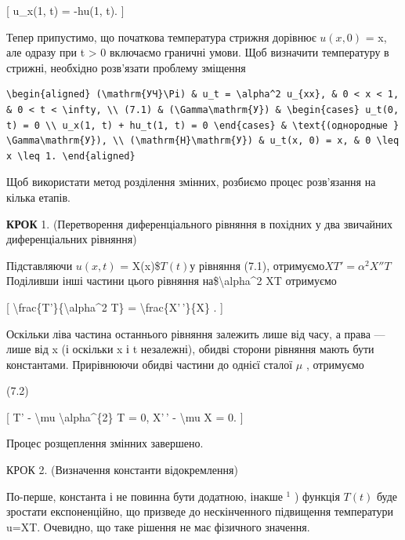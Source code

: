 \documentclass[
]{article}
\begin{document}
{[} u\_x(1, t) = -hu(1, t). {]}

Тепер припустимо, що початкова температура стрижня дорівнює \(u(x, 0)\)
= x, але одразу при t \textgreater{} 0 включаємо граничні умови. Щоб
визначити температуру в стрижні, необхідно розв'язати проблему зміщення

\begin{verbatim}
\begin{aligned} (\mathrm{УЧ}\Pi) & u_t = \alpha^2 u_{xx}, & 0 < x < 1, & 0 < t < \infty, \\ (7.1) & (\Gamma\mathrm{У}) & \begin{cases} u_t(0, t) = 0 \\ u_x(1, t) + hu_t(1, t) = 0 \end{cases} & \text{(однородные } \Gamma\mathrm{У}), \\ (\mathrm{H}\mathrm{У}) & u_t(x, 0) = x, & 0 \leq x \leq 1. \end{aligned}
\end{verbatim}

Щоб використати метод розділення змінних, розбиємо процес розв'язання на
кілька етапів.

\textbf{КРОК} 1. (Перетворення диференціального рівняння в похідних у
два звичайних диференціальних рівняння)

Підставляючи \(u(x, t)\) = X(x)\$\(T(t)\)у рівняння (7.1),
отримуємо\(XT' = \alpha^2 X''T\)Поділивши інші частини цього рівняння
на\$\textbackslash alpha\^{}2 XT отримуємо

{[} \textbackslash frac\{T'\}\{\textbackslash alpha\^{}2 T\} =
\textbackslash frac\{X'\,'\}\{X\} . {]}

Оскільки ліва частина останнього рівняння залежить лише від часу, а
права --- лише від x (і оскільки x і t незалежні), обидві сторони
рівняння мають бути константами. Прирівнюючи обидві частини до однієї
сталої \(\mu\) , отримуємо

(7.2)

{[} T' - \textbackslash mu \textbackslash alpha\^{}\{2\} T = 0, X'\,' -
\textbackslash mu X = 0. {]}

Процес розщеплення змінних завершено.

КРОК 2. (Визначення константи відокремлення)

По-перше, константа і не повинна бути додатною, інакше \(^{1}\) )
функція \(T\left( t\right)\) буде зростати експоненційно, що призведе до
нескінченного підвищення температури u=XT. Очевидно, що таке рішення не
має фізичного значення.
\end{document}
